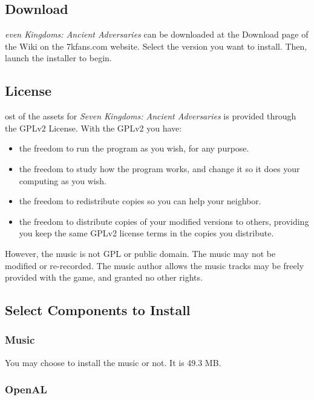 \subsection{Download}

\textit{even Kingdoms: Ancient Adversaries} can be downloaded at the Download page of the Wiki on the 7kfans.com website. Select the version you want to install. Then, launch the installer to begin.

\subsection{License}

ost of the assets for \textit{Seven Kingdoms: Ancient Adversaries} is provided through the GPLv2 License. With the GPLv2 you have: 

\begin{itemize}
	\item the freedom to run the program as you wish, for any purpose.
	\item the freedom to study how the program works, and change it so it does your computing as you wish. 
	\item the freedom to redistribute copies so you can help your neighbor.
	\item the freedom to distribute copies of your modified versions to others, providing you keep the same GPLv2 license terms in the copies you distribute.
\end{itemize}

However, the music is not GPL or public domain. The music may not be modified or re-recorded. The music author allows the music tracks may be freely provided with the game, and granted no other rights.

\subsection{Select Components to Install}

\subsubsection{Music}

You may choose to install the music or not. It is 49.3 MB.

\subsubsection{OpenAL}

